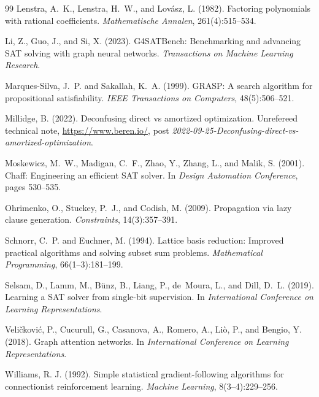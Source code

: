 \documentclass[final,5p,times,twocolumn]{elsarticle}
\begin{document}
\begin{thebibliography}{99}
Lenstra, A.~K., Lenstra, H.~W., and Lov\'asz, L. (1982).
Factoring polynomials with rational coefficients.
\emph{Mathematische Annalen}, 261(4):515--534.

Li, Z., Guo, J., and Si, X. (2023).
G4SATBench: Benchmarking and advancing SAT solving with graph neural networks.
\emph{Transactions on Machine Learning Research}.

Marques-Silva, J.~P. and Sakallah, K.~A. (1999).
GRASP: A search algorithm for propositional satisfiability.
\emph{IEEE Transactions on Computers}, 48(5):506--521.

Millidge, B. (2022).
Deconfusing direct vs amortized optimization.
Unrefereed technical note, \url{https://www.beren.io/}, post \emph{2022-09-25-Deconfusing-direct-vs-amortized-optimization}.

Moskewicz, M.~W., Madigan, C.~F., Zhao, Y., Zhang, L., and Malik, S. (2001).
Chaff: Engineering an efficient SAT solver.
In \emph{Design Automation Conference}, pages 530--535.

Ohrimenko, O., Stuckey, P.~J., and Codish, M. (2009).
Propagation via lazy clause generation.
\emph{Constraints}, 14(3):357--391.

Schnorr, C.~P. and Euchner, M. (1994).
Lattice basis reduction: Improved practical algorithms and solving subset sum problems.
\emph{Mathematical Programming}, 66(1--3):181--199.

Selsam, D., Lamm, M., B\"unz, B., Liang, P., de~Moura, L., and Dill, D.~L. (2019).
Learning a SAT solver from single-bit supervision.
In \emph{International Conference on Learning Representations}.

Veli\v{c}kovi\'c, P., Cucurull, G., Casanova, A., Romero, A., Li\`o, P., and Bengio, Y. (2018).
Graph attention networks.
In \emph{International Conference on Learning Representations}.

Williams, R. J. (1992).
Simple statistical gradient-following algorithms for connectionist reinforcement learning.
\emph{Machine Learning}, 8(3--4):229--256.


\end{thebibliography}
\end{document}
